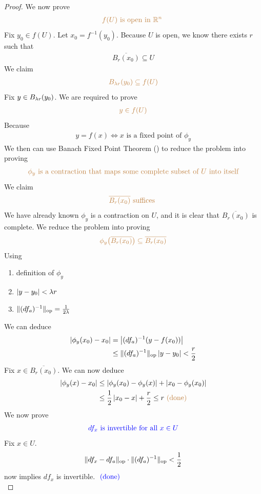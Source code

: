 \documentclass{report}
\begin{document}
\begin{proof}
We now prove 
\begin{align*}
\textcolor{brown}{f(U)\text{ is open in $\mathbb{R}^n$ }}
\end{align*}
Fix $y_0 \in f(U)$. Let $x_0= f^{-1}(y_0)$. Because $U$ is open, we know there exists $r$ such that 
\begin{align*}
  \overline{B_r(x_0)}\subseteq U
\end{align*}
We claim 
\begin{align*}
  \textcolor{brown}{B_{\lambda r}(y_0)\subseteq f(U)}
\end{align*}
Fix $y\in B_{\lambda r}(y_0)$. We are required to prove 
\begin{align*}
  \textcolor{brown}{y\in f(U)}
\end{align*}
Because 
\begin{align*}
y=f(x)\iff  x\text{ is a fixed point of }\phi_y
\end{align*}
We then can use Banach Fixed Point Theorem () to reduce the problem into proving 
\begin{align*}
\textcolor{brown}{\phi_y\text{ is a contraction that maps some complete subset of $U$ into  itself}}
\end{align*}
We claim 
\begin{align*}
\textcolor{brown}{\overline{B_r(x_0)}\text{ suffices }}
\end{align*}
We have already known $\phi_y$ is a contraction on $U$, and it is clear that $\overline{B_r(x_0)}$ is complete. We reduce the problem into proving 
\begin{align*}
\textcolor{brown}{\phi_y\big(\overline{B_r(x_0)} \big)\subseteq \overline{B_r(x_0)}}
\end{align*}
Using
\begin{enumerate}[label=(\alph*)]
  \item definition of $\phi_y$
  \item $\left|y-y_0\right|<\lambda r$ 
  \item $\| (df_a)^{-1} \|_\text{op}=\frac{1}{2\lambda }$
\end{enumerate}
We can deduce 
\begin{align*}
\left|\phi_y (x_0)-x_0\right|&= \left|(df_a)^{-1}(y-f(x_0))\right|\\
&\leq \| (df_a)^{-1} \|_\text{op} \left|y-y_0\right|<\frac{r}{2}
\end{align*}
Fix $x\in \overline{B_r(x_0)}$. We can now deduce 
\begin{align*}
  \left|\phi_y (x)-x_0\right|&\leq \left|\phi_y (x_0)-\phi_y (x)\right|+\left|x_0-\phi_y (x_0)\right|\\
&\leq \frac{1}{2}\left|x_0-x\right|+\frac{r}{2}\leq r \textcolor{brown}{\text{ (done) }}
\end{align*}
We now prove 
\begin{align*}
\textcolor{blue}{df_x\text{ is invertible for all }x \in U}
\end{align*}
Fix $x\in U$.  
\begin{align*}
\| df_x-df_a \|_\text{op}\cdot \| (df_a)^{-1} \|_\text{op}<\frac{1}{2}
\end{align*}
 now implies $df_x$ is invertible. $\textcolor{blue}{\text{ (done) }}$\\


\end{proof}
\end{document}
